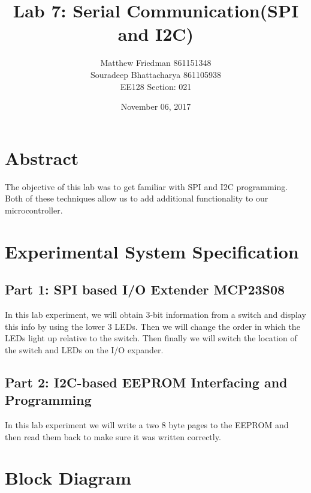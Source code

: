 \documentclass{article}
\title{Lab 7: Serial Communication(SPI and I2C)}
\date{November 06, 2017}
\author{Matthew Friedman 861151348\\Souradeep Bhattacharya 861105938\\EE128 Section: 021}
\begin{document}
	\maketitle
	\section*{Abstract}
	The objective of this lab was to get familiar with SPI and I2C programming. Both of these techniques allow us to add additional functionality to our microcontroller.
	\section*{Experimental System Specification}
	\subsection*{Part 1: SPI based I/O Extender MCP23S08}
	In this lab experiment, we will obtain 3-bit information from a switch and display this info by using the lower 3 LEDs. Then we will change the order in which the LEDs light up relative to the switch. Then finally we will switch the location of the switch and LEDs on the I/O expander.
	\subsection*{Part 2: I2C-based EEPROM Interfacing and Programming}
	In this lab experiment we will write a two 8 byte pages to the EEPROM and then read them back to make sure it was written correctly.
	\section*{Block Diagram}
\end{document}
